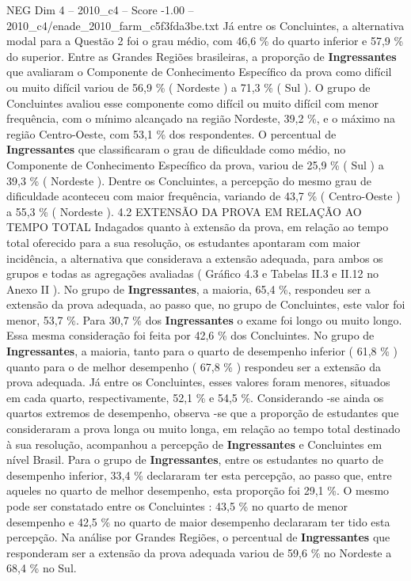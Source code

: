 \begin{textsample}{NEG Dim 4 – 2010\_c4 – Score -1.00 – 2010\_c4/enade\_2010\_farm\_c5f3fda3be.txt}
Já entre os Concluintes, a alternativa modal para a Questão 2 foi o grau médio, com 46,6 \% do quarto inferior e 57,9 \% do superior.
Entre as Grandes Regiões brasileiras, a proporção de \textbf{Ingressantes} que avaliaram o Componente de Conhecimento Específico da prova como difícil ou muito difícil variou de 56,9 \% ( Nordeste ) a 71,3 \% ( Sul ).
O grupo de Concluintes avaliou esse componente como difícil ou muito difícil com menor frequência, com o mínimo alcançado na região Nordeste, 39,2 \%, e o máximo na região Centro-Oeste, com 53,1 \% dos respondentes.
O percentual de \textbf{Ingressantes} que classificaram o grau de dificuldade como médio, no Componente de Conhecimento Específico da prova, variou de 25,9 \% ( Sul ) a 39,3 \% ( Nordeste ).
Dentre os Concluintes, a percepção do mesmo grau de dificuldade aconteceu com maior frequência, variando de 43,7 \% ( Centro-Oeste ) a 55,3 \% ( Nordeste ). 4.2 EXTENSÃO DA PROVA EM RELAÇÃO AO TEMPO TOTAL Indagados quanto à extensão da prova, em relação ao tempo total oferecido para a sua resolução, os estudantes apontaram com maior incidência, a alternativa que considerava a extensão adequada, para ambos os grupos e todas as agregações avaliadas ( Gráfico 4.3 e Tabelas II.3 e II.12 no Anexo II ).
No grupo de \textbf{Ingressantes}, a maioria, 65,4 \%, respondeu ser a extensão da prova adequada, ao passo que, no grupo de Concluintes, este valor foi menor, 53,7 \%.
Para 30,7 \% dos \textbf{Ingressantes} o exame foi longo ou muito longo.
Essa mesma consideração foi feita por 42,6 \% dos Concluintes.
No grupo de \textbf{Ingressantes}, a maioria, tanto para o quarto de desempenho inferior ( 61,8 \% ) quanto para o de melhor desempenho ( 67,8 \% ) respondeu ser a extensão da prova adequada.
Já entre os Concluintes, esses valores foram menores, situados em cada quarto, respectivamente, 52,1 \% e 54,5 \%.
Considerando -se ainda os quartos extremos de desempenho, observa -se que a proporção de estudantes que consideraram a prova longa ou muito longa, em relação ao tempo total destinado à sua resolução, acompanhou a percepção de \textbf{Ingressantes} e Concluintes em nível Brasil.
Para o grupo de \textbf{Ingressantes}, entre os estudantes no quarto de desempenho inferior, 33,4 \% declararam ter esta percepção, ao passo que, entre aqueles no quarto de melhor desempenho, esta proporção foi 29,1 \%.
O mesmo pode ser constatado entre os Concluintes : 43,5 \% no quarto de menor desempenho e 42,5 \% no quarto de maior desempenho declararam ter tido esta percepção.
Na análise por Grandes Regiões, o percentual de \textbf{Ingressantes} que responderam ser a extensão da prova adequada variou de 59,6 \% no Nordeste a 68,4 \% no Sul.

\end{textsample}
